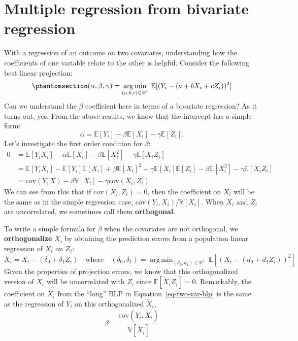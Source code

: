 \documentclass[
  13pt,
  letterpaper,
  DIV=11,
  numbers=noendperiod]{scrreprt}
\newcommand{\E}{\mathbb{E}}
\newcommand{\V}{\mathbb{V}}
\newcommand{\cov}{\text{cov}}
\DeclareMathOperator*{\argmin}{arg\,min}
\theoremstyle{plain}
\theoremstyle{definition}
\theoremstyle{definition}
\theoremstyle{remark}
\begin{document}
\section{Multiple regression from bivariate regression}\label{sec-fwl}

With a regression of an outcome on two covariates, understanding how the
coefficients of one variable relate to the other is helpful. Consider
the following best linear projection:
\begin{equation}\phantomsection\label{eq-two-var-blp}{ 
(\alpha, \beta, \gamma) = \argmin_{(a,b,c) \in \mathbb{R}^{3}} \; \E[(Y_{i} - (a + bX_{i} + cZ_{i}))^{2}]
}\end{equation} Can we understand the \(\beta\) coefficient here in
terms of a bivariate regression? As it turns out, yes. From the above
results, we know that the intercept has a simple form: \[
\alpha = \E[Y_i] - \beta\E[X_i] - \gamma\E[Z_i].
\] Let's investigate the first order condition for \(\beta\): \[ 
\begin{aligned}
  0 &= \E[Y_{i}X_{i}] - \alpha\E[X_{i}] - \beta\E[X_{i}^{2}] - \gamma\E[X_{i}Z_{i}] \\
    &= \E[Y_{i}X_{i}] - \E[Y_{i}]\E[X_{i}] + \beta\E[X_{i}]^{2} + \gamma\E[X_{i}]\E[Z_{i}] - \beta\E[X_{i}^{2}] - \gamma\E[X_{i}Z_{i}] \\
  &= \cov(Y, X) - \beta\V[X_{i}] - \gamma \cov(X_{i}, Z_{i})
\end{aligned}
\] We can see from this that if \(\cov(X_{i}, Z_{i}) = 0\), then the
coefficient on \(X_i\) will be the same as in the simple regression
case, \(\cov(Y_{i}, X_{i})/\V[X_{i}]\). When \(X_i\) and \(Z_i\) are
uncorrelated, we sometimes call them \textbf{orthogonal}.

To write a simple formula for \(\beta\) when the covariates are not
orthogonal, we \textbf{orthogonalize} \(X_i\) by obtaining the
prediction errors from a population linear regression of \(X_i\) on
\(Z_i\): \[ 
\widetilde{X}_{i} = X_{i} - (\delta_{0} + \delta_{1}Z_{i}) \quad\text{where}\quad (\delta_{0}, \delta_{1}) = \argmin_{(d_{0},d_{1}) \in \mathbb{R}^{2}} \; \E[(X_{i} - (d_{0} + d_{1}Z_{i}))^{2}]
\] Given the properties of projection errors, we know that this
orthogonalized version of \(X_{i}\) will be uncorrelated with \(Z_{i}\)
since \(\E[\widetilde{X}_{i}Z_{i}] = 0\). Remarkably, the coefficient on
\(X_i\) from the ``long'' BLP in Equation~\ref{eq-two-var-blp} is the
same as the regression of \(Y_i\) on this orthogonalized
\(\widetilde{X}_i\), \[ 
\beta = \frac{\text{cov}(Y_{i}, \widetilde{X}_{i})}{\V[\widetilde{X}_{i}]}
\]
\end{document}
